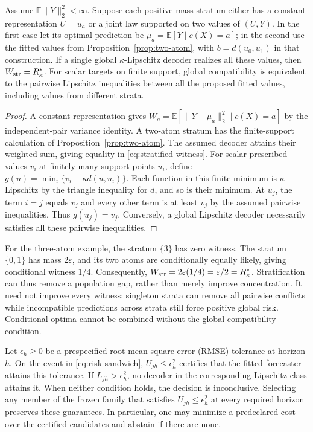 \begin{proposition}
\label{prop:stratified-exactness}
Assume $\mathbb E\|Y\|_2^2<\infty$. Suppose each positive-mass
stratum either has a constant representation
$U=u_a$ or a joint law supported on two values of $(U,Y)$.
In the first case let its optimal prediction be
$\mu_a=\mathbb E[Y\mid c(X)=a]$; in the second use the fitted values
from Proposition~\ref{prop:two-atom}, with $b=d(u_0,u_1)$ in that
construction. If a single global
$\kappa$-Lipschitz decoder realizes all these values, then
$W_{\rm str}=R^*_\kappa$. For scalar targets on finite support, global
compatibility is equivalent to the pairwise Lipschitz inequalities between
all the proposed fitted values, including values from different strata.
\end{proposition}

\begin{proof}
A constant representation gives
$W_a=\mathbb E[\|Y-\mu_a\|_2^2\mid c(X)=a]$ by the independent-pair
variance identity. A two-atom stratum has the finite-support calculation of
Proposition~\ref{prop:two-atom}. The assumed decoder attains their weighted
sum, giving equality in \eqref{eq:stratified-witness}. For scalar prescribed
values $v_i$ at finitely many support points $u_i$, define
$g(u)=\min_i\{v_i+\kappa d(u,u_i)\}$. Each function in this finite
minimum is $\kappa$-Lipschitz by the triangle inequality for $d$, and
so is their minimum. At $u_j$, the term $i=j$ equals $v_j$ and every
other term is at least $v_j$ by the assumed pairwise inequalities.
Thus $g(u_j)=v_j$. Conversely, a global Lipschitz decoder necessarily
satisfies all these pairwise inequalities.
\end{proof}

For the three-atom example, the stratum $\{3\}$ has zero witness.
The stratum $\{0,1\}$ has mass $2\varepsilon$, and its two atoms
are conditionally equally likely, giving conditional witness $1/4$.
Consequently, $W_{\rm str}=2\varepsilon(1/4)=\varepsilon/2=R^*_\kappa$.
Stratification can thus remove a population gap, rather than merely improve
concentration. It need not improve every witness: singleton strata can remove
all pairwise conflicts while incompatible predictions across strata still
force positive global risk. Conditional optima cannot be combined without
the global compatibility condition.

\begin{corollary}
\label{cor:decisions}
Let $\epsilon_h\geq0$ be a prespecified root-mean-square error (RMSE)
tolerance at horizon $h$. On the event in \eqref{eq:risk-sandwich},
$U_{jh}\leq\epsilon_h^2$ certifies that the fitted forecaster attains
this tolerance. If $L_{jh}>\epsilon_h^2$, no decoder in the corresponding
Lipschitz class attains it. When neither condition holds, the decision is
inconclusive.
Selecting any member of the frozen family that satisfies
$U_{jh}\leq\epsilon_h^2$ at every required horizon preserves these
guarantees. In particular, one may minimize a predeclared cost over the
certified candidates and abstain if there are none.
\end{corollary}

